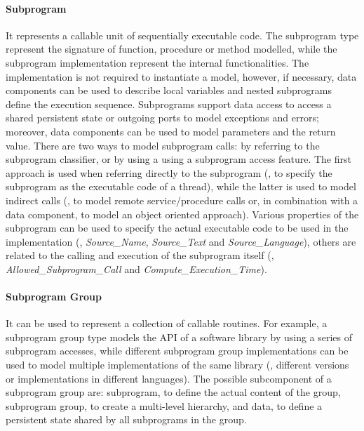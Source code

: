 \paragraph{Subprogram} It represents a callable unit of sequentially executable code. The subprogram type represent the signature of function, procedure or method modelled, while the subprogram implementation represent the internal functionalities. The implementation is not required to instantiate a model, however, if necessary, data components can be used to describe local variables and nested subprograms define the execution sequence. Subprograms support data access to access a shared persistent state or outgoing ports to model exceptions and errors; moreover, data components can be used to model parameters and the return value. There are two ways to model subprogram calls: by referring to the subprogram classifier, or by using a using a subprogram access feature. The first approach is used when referring directly to the subprogram (\eg, to specify the subprogram as the executable code of a thread), while the latter is used to model indirect calls (\eg, to model remote service/procedure calls or, in combination with a data component, to model an object oriented approach). Various properties of the subprogram can be used to specify the actual executable code to be used in the implementation (\eg, \textit{Source\_Name}, \textit{Source\_Text} and \textit{Source\_Language}), others are related to the calling and execution of the subprogram itself (\eg, \textit{Allowed\_Subprogram\_Call} and \textit{Compute\_Execution\_Time}).

\paragraph{Subprogram Group} It can be used to represent a collection of callable routines. For example, a subprogram group type models the API of a software library by using a series of subprogram accesses, while different subprogram group implementations can be used to model multiple implementations of the same library (\eg, different versions or implementations in different languages). The possible subcomponent of a subprogram group are: subprogram, to define the actual content of the group, subprogram group, to create a multi-level hierarchy, and data, to define a persistent state shared by all subprograms in the group.

